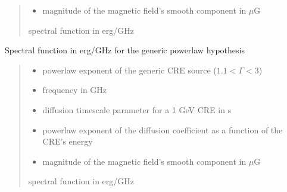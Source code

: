 \documentclass[letterpaper,10pt,english]{sphinxmanual}
\begin{document}
\begin{fulllineitems}
\begin{quote}
\begin{description}
\begin{itemize}
\item {} 
\sphinxAtStartPar
{} \textendash{} magnitude of the magnetic field’s smooth component in \(\mu\)G

\end{itemize}

\sphinxAtStartPar
spectral function in erg/GHz

\end{description}\end{quote}

\end{fulllineitems}


\begin{fulllineitems}
\label{\detokenize{diffsph.spectra:diffsph.spectra.synchrotron.X_pw}}
\pysigstartsignatures
{}
\pysigstopsignatures
\sphinxAtStartPar
Spectral function in erg/GHz for the generic power\sphinxhyphen{}law hypothesis
\begin{quote}\begin{description}
\begin{itemize}
\item {} 
\sphinxAtStartPar
{} \textendash{} power\sphinxhyphen{}law exponent of the generic CRE source (\(1.1 < \Gamma < 3\))

\item {} 
\sphinxAtStartPar
{} \textendash{} frequency in GHz

\item {} 
\sphinxAtStartPar
{} \textendash{} diffusion time\sphinxhyphen{}scale parameter for a 1 GeV CRE in s

\item {} 
\sphinxAtStartPar
{} \textendash{} power\sphinxhyphen{}law exponent of the diffusion coefficient as a function of the CRE’s energy

\item {} 
\sphinxAtStartPar
{} \textendash{} magnitude of the magnetic field’s smooth component in \(\mu\)G

\end{itemize}

\sphinxAtStartPar
spectral function in erg/GHz

\end{description}\end{quote}

\end{fulllineitems}
\end{document}

